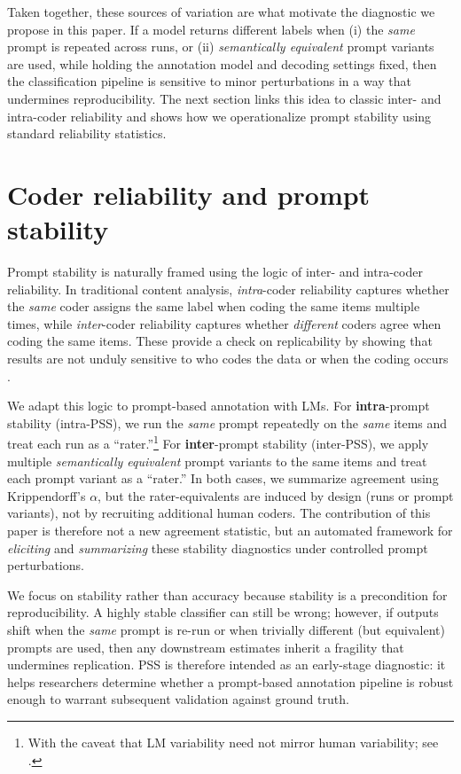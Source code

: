 \documentclass{article}
\begin{document}
Taken together, these sources of variation are what motivate the diagnostic we propose in this paper. If a model returns different labels when (i) the \emph{same} prompt is repeated across runs, or (ii) \emph{semantically equivalent} prompt variants are used, while holding the annotation model and decoding settings fixed, then the classification pipeline is sensitive to minor perturbations in a way that undermines reproducibility. The next section links this idea to classic inter- and intra-coder reliability and shows how we operationalize prompt stability using standard reliability statistics.

\section{Coder reliability and prompt stability}

Prompt stability is naturally framed using the logic of inter- and intra-coder reliability. In traditional content analysis, \emph{intra}-coder reliability captures whether the \emph{same} coder assigns the same label when coding the same items multiple times, while \emph{inter}-coder reliability captures whether \emph{different} coders agree when coding the same items. These provide a check on replicability by showing that results are not unduly sensitive to who codes the data or when the coding occurs \citep{o2020intercoder, belur2021interrater, lamprianou2023measuring}.

We adapt this logic to prompt-based annotation with LMs. For \textbf{intra}-prompt stability (intra-PSS), we run the \emph{same} prompt repeatedly on the \emph{same} items and treat each run as a ``rater.''\footnote{With the caveat that LM variability need not mirror human variability; see \cite{barrie2024replication}.} For \textbf{inter}-prompt stability (inter-PSS), we apply multiple \emph{semantically equivalent} prompt variants to the same items and treat each prompt variant as a ``rater.'' In both cases, we summarize agreement using Krippendorff's $\alpha$, but the rater-equivalents are induced by design (runs or prompt variants), not by recruiting additional human coders. The contribution of this paper is therefore not a new agreement statistic, but an automated framework for \emph{eliciting} and \emph{summarizing} these stability diagnostics under controlled prompt perturbations.

We focus on stability rather than accuracy because stability is a precondition for reproducibility. A highly stable classifier can still be wrong; however, if outputs shift when the \emph{same} prompt is re-run or when trivially different (but equivalent) prompts are used, then any downstream estimates inherit a fragility that undermines replication. PSS is therefore intended as an early-stage diagnostic: it helps researchers determine whether a prompt-based annotation pipeline is robust enough to warrant subsequent validation against ground truth.
\end{document}
